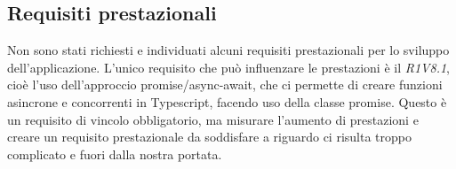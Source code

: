 \subsection{Requisiti prestazionali}
Non sono stati richiesti e individuati alcuni requisiti prestazionali per lo sviluppo dell'applicazione. L'unico requisito che può influenzare le prestazioni è il \textit{R1V8.1}, cioè l'uso dell'approccio promise/async-await, che ci permette di creare funzioni asincrone e concorrenti in Typescript, facendo uso della classe promise. Questo è un requisito di vincolo obbligatorio, ma misurare l'aumento di prestazioni e creare un requisito prestazionale da soddisfare a riguardo ci risulta troppo complicato e fuori dalla nostra portata.